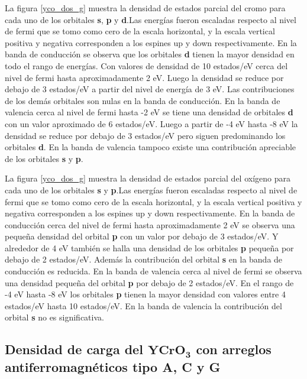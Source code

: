 \noindent La figura \ref{yco_dos_g}  muestra la densidad de 
estados parcial del 
cromo para 
cada 
uno de los orbitales \textbf{s}, \textbf{p} y \textbf{d}.Las 
energ\'ias fueron escaladas 
respecto al 
nivel de fermi que se tomo como cero de la escala horizontal, y la 
escala 
vertical positiva y negativa corresponden a los espines up y down 
respectivamente. En la banda de conducci\'on se observa que los 
orbitales \textbf{d} tienen la mayor densidad en todo el rango de 
energ\'ias. Con valores de densidad de 10 estados/eV cerca del nivel 
de fermi hasta aproximadamente 2 eV. Luego la densidad se reduce por 
debajo de 3 estados/eV a partir del nivel de energ\'ia de 3 eV. Las 
contribuciones de los dem\'as orbitales son nulas en la banda de 
conducci\'on. En la banda de valencia cerca al nivel de fermi hasta -2 
eV se tiene una densidad de orbitales \textbf{d} con un valor 
aproximado de 6 estados/eV. Luego a partir de -4 eV hasta -8 eV la 
densidad se reduce por debajo de 3 estados/eV pero siguen predominando 
los orbitales \textbf{d}. En la banda de valencia tampoco existe una 
contribuci\'on apreciable de los orbitales \textbf{s} y \textbf{p}.


\noindent La figura \ref{yco_dos_g}  muestra la densidad de 
estados parcial del 
ox\'igeno para 
cada 
uno de los orbitales \textbf{s} y \textbf{p}.Las 
energ\'ias fueron escaladas 
respecto al 
nivel de fermi que se tomo como cero de la escala horizontal, y la 
escala 
vertical positiva y negativa corresponden a los espines up y down 
respectivamente. En la banda de conducci\'on cerca del nivel de fermi 
hasta aproximadamente 2 eV se observa una peque\~na densidad del 
orbital \textbf{p} con un valor por debajo de 3 estados/eV. Y 
alrededor de 4 eV tambi\'en se halla una densidad de los orbitales 
\textbf{p} peque\~na por debajo de 2 estados/eV. Adem\'as la 
contribuci\'on del orbital \textbf{s} en la banda de conducci\'on es 
reducida. En la banda de valencia cerca al nivel de fermi se observa 
una densidad peque\~na del orbital \textbf{p} por debajo de 2 
estados/eV. En el rango de -4 eV hasta -8 eV los orbitales \textbf{p} 
tienen la mayor densidad con valores entre 4 estados/eV hasta 10 
estados/eV. En la banda de valencia la contribuci\'on del orbital 
\textbf{s} no es significativa.


\subsection{Densidad de carga del $\mathbf{YCrO_{3}}$ con arreglos      
    antiferromagn\'eticos tipo A, C y G}

